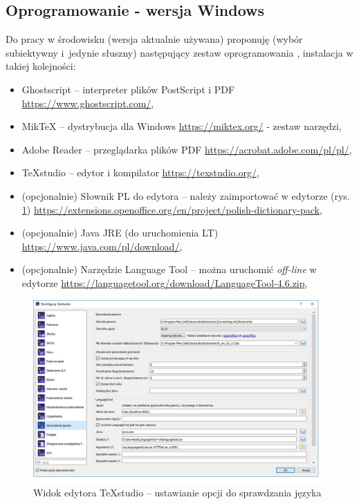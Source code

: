 \documentclass[
    left=2.5cm,         %
    right=2.5cm,        %
    top=2.5cm,          %
    bottom=3cm,         %
    bindingoffset=6mm,  %
    nohyphenation=true %
]{eiti/eiti-thesis} %
\begin{document}
\subsection{Oprogramowanie - wersja Windows}
\label{sec:oprogramowanie}
Do pracy w środowisku \LaTeXe{} (wersja aktualnie używana) proponuję (wybór subiektywny i~jedynie słuszny) następujący zestaw oprogramowania \cite{Ghostscript, MikTeX, TeXstudio}, instalacja w takiej kolejności:
\begin{itemize}
	\item Ghostscript -- interpreter plików PostScript i PDF  \url{https://www.ghostscript.com/},
	\item MikTeX -- dystrybucja dla Windows  \url{https://miktex.org/} - zestaw narzędzi,
	\item Adobe Reader -- przeglądarka plików PDF \url{https://acrobat.adobe.com/pl/pl/},
	\item TeXstudio -- edytor i kompilator \url{https://texstudio.org/},
	\item (opcjonalnie) Słownik PL do edytora -- należy zaimportować w edytorze (rys. \ref{fig:rysunek_spr})  \url{https://extensions.openoffice.org/en/project/polish-dictionary-pack},
	\item (opcjonalnie) Java JRE (do uruchomienia LT) \url{https://www.java.com/pl/download/},
	\item (opcjonalnie) Narzędzie Language Tool -- można uruchomić \textit{off-line} w edytorze \url{https://languagetool.org/download/LanguageTool-4.6.zip},
\end{itemize}

\begin{figure}[h]
	\centering
	\includegraphics[width=1\textwidth]{texstudio_sprawdzanie_jezyka.jpg}
	\caption{\label{fig:rysunek_spr}Widok edytora TeXstudio -- ustawianie opcji do sprawdzania języka}
\end{figure}
\end{document}
